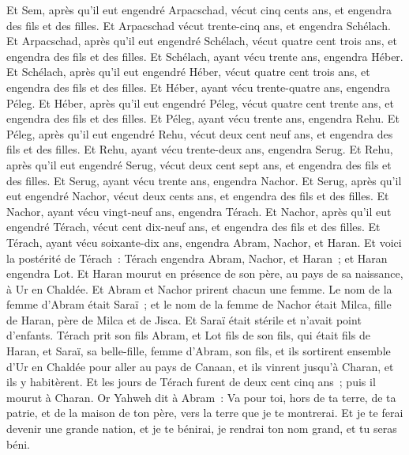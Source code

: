 \begin{multicols}{2}
Et Sem, après qu'il eut engendré Arpacschad, vécut cinq cents ans, et engendra des fils et des filles.
Et Arpacschad vécut trente-cinq ans, et engendra Schélach.
Et Arpacschad, après qu'il eut engendré Schélach, vécut quatre cent trois ans, et engendra des fils et des filles.
Et Schélach, ayant vécu trente ans, engendra Héber.
Et Schélach, après qu'il eut engendré Héber, vécut quatre cent trois ans, et engendra des fils et des filles.
Et Héber, ayant vécu trente-quatre ans, engendra Péleg.
Et Héber, après qu'il eut engendré Péleg, vécut quatre cent trente ans, et engendra des fils et des filles.
Et Péleg, ayant vécu trente ans, engendra Rehu.
Et Péleg, après qu'il eut engendré Rehu, vécut deux cent neuf ans, et engendra des fils et des filles.
Et Rehu, ayant vécu trente-deux ans, engendra Serug.
Et Rehu, après qu'il eut engendré Serug, vécut deux cent sept ans, et engendra des fils et des filles.
Et Serug, ayant vécu trente ans, engendra Nachor.
Et Serug, après qu'il eut engendré Nachor, vécut deux cents ans, et engendra des fils et des filles.
Et Nachor, ayant vécu vingt-neuf ans, engendra Térach.
Et Nachor, après qu'il eut engendré Térach, vécut cent dix-neuf ans, et engendra des fils et des filles.
Et Térach, ayant vécu soixante-dix ans, engendra Abram, Nachor, et Haran.
Et voici la postérité de Térach~: Térach engendra Abram, Nachor, et Haran~; et Haran engendra Lot.
Et Haran mourut en présence de son père, au pays de sa naissance, à Ur en Chaldée.
Et Abram et Nachor prirent chacun une femme. Le nom de la femme d'Abram était Saraï~; et le nom de la femme de Nachor était Milca, fille de Haran, père de Milca et de Jisca.
Et Saraï était stérile et n'avait point d'enfants.
Térach prit son fils Abram, et Lot fils de son fils, qui était fils de Haran, et Saraï, sa belle-fille, femme d'Abram, son fils, et ils sortirent ensemble d'Ur en Chaldée pour aller au pays de Canaan, et ils vinrent jusqu'à Charan, et ils y habitèrent.
Et les jours de Térach furent de deux cent cinq ans~; puis il mourut à Charan.
\VerseOne{}Or Yahweh dit à Abram~: Va pour toi, hors de ta terre, de ta patrie, et de la maison de ton père, vers la terre que je te montrerai.
Et je te ferai devenir une grande nation, et je te bénirai, je rendrai ton nom grand, et tu seras béni.

\end{multicols}
